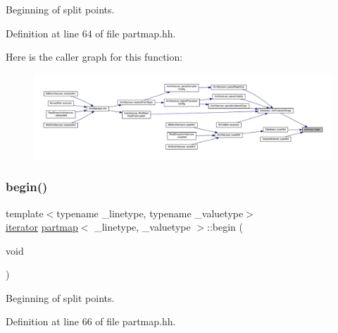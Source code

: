 Beginning of split points. 



Definition at line 64 of file partmap.\+hh.

Here is the caller graph for this function\+:
\nopagebreak
\begin{figure}[H]
\begin{center}
\leavevmode
\includegraphics[width=350pt]{classpartmap_a8c5b499b66156957ec95c209ad1440cc_icgraph}
\end{center}
\end{figure}
\mbox{\label{classpartmap_a0df0de132681c65c1918d3e484c7679e}} 
\subsubsection{\texorpdfstring{begin()}{begin()}\hspace{0.1cm}{\footnotesize\ttfamily [2/4]}}
{\footnotesize\ttfamily template$<$typename \+\_\+linetype, typename \+\_\+valuetype$>$ \\
\mbox{\hyperlink{classpartmap_a795a7501233dbf866b98a51585552d06}{iterator}} \mbox{\hyperlink{classpartmap}{partmap}}$<$ \+\_\+linetype, \+\_\+valuetype $>$\+::begin (\begin{DoxyParamCaption}\item[{void}]{ }\end{DoxyParamCaption})\hspace{0.3cm}{\ttfamily [inline]}}



Beginning of split points. 



Definition at line 66 of file partmap.\+hh.

\mbox{\label{classpartmap_a6dbc4a059f360ad84371d54e53afe5d7}} 
